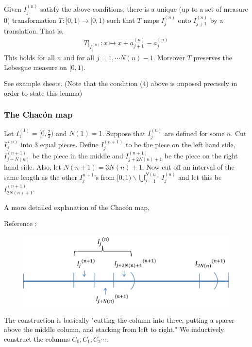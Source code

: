 \documentclass[10pt,a4paper]{report}
\newenvironment{proof}
{\begin{changemargin}{1cm}{0.5cm} 
	}%
	{\end{changemargin}
}
\begin{document}
\lem Given $I_j^{(n)}$ satisfy the above conditions, there is a unique (up to a set of measure 0) transformation $T: [0,1) \rightarrow [0,1)$ such that $T$ maps $I_j^{(n)}$ onto $I_{j+1}^{(n)}$ by a translation. That is, 
\begin{align*}
T \big|_{I_{j}^{(n)}} : x \mapsto x + a_{j+1}^{(n)} - a_j^{(n)}
\end{align*}
This holds for all $n$ and for all $j=1, \cdots N(n)-1$. Moreover $T$ preserves the Lebesgue measure on $[0,1)$.
\begin{proof}
\pf See example sheets. (Note that the condition (4) above is imposed precisely in order to state this lemma)
\end{proof}
\s

\subsubsection*{The Chac\'{o}n map}

Let $I_1^{(1)} = [0,\frac{2}{3})$ and $N(1) =1$. Suppose that $I_j^{(n)}$ are defined for some $n$. Cut $I_{j}^{(n)}$ into 3 equal pieces. Define $I_j^{(n+1)}$ to be the piece on the left hand side, $I_{j+N(n)}^{(n+1)}$ be the piece in the middle and $I_{j+2N(n)+1}^{(n+1)}$ be the piece on the right hand side. Also, let $N(n+1) = 3N(n)+1$. Now cut off an interval of the same length as the other $I_j^{n+1}$'s from $[0,1) \backslash \bigcup_{j=1}^{N(n)} I_j^{(n)}$ and let this be $I_{2N(n)+1}^{(n+1)}$.
\s

\digression

A more detailed explanation of the Chac\'{o}n map, 

Reference : 
\s

\begin{figure}[h]
	\centering
	\includegraphics[scale=0.4]{1}
\end{figure}

The construction is basically "cutting the column into three, putting a spacer above the middle column, and stacking from left to right." We inductively construct the columns $C_0, C_1, C_2 \cdots$.
\s
\end{document}
